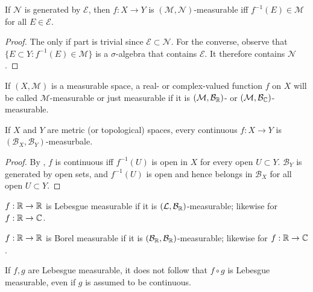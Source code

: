 \begin{proposition}
    If $\mathcal{N}$ is generated by $\mathcal{E}$, then $f: X \to Y$ is $(\mathcal{M}, \mathcal{N})$-measurable iff $f^{-1}(E) \in \mathcal{M}$ for all $E \in \mathcal{E}$. 
\end{proposition}

\begin{proof}
    The only if part is trivial since $\mathcal{E} \subset \mathcal{N}$.
    For the converse, observe that $\{ E \subset Y: f^{-1}(E) \in \mathcal{M} \}$ is a $\sigma$-algebra that contains $\mathcal{E}$.
    It therefore contains $\mathcal{N}$.
\end{proof}

\begin{definition}
    If $(X, \mathcal{M})$ is a measurable space, a real- or complex-valued function $f$ on $X$ will be called $\mathcal{M}$-measurable or just measurable if it is $(\mathcal{M}, \mathcal{B}_{\mathbb{R}})$- or $(\mathcal{M}, \mathcal{B}_{\mathbb{C}})$-measurable.
\end{definition}

\begin{corollary}
    If $X$ and $Y$ are metric (or topological) spaces, every continuous $f:X \to Y$ is $(\mathcal{B}_{X}, \mathcal{B}_{Y})$-measurbale.
\end{corollary}

\begin{proof}
    By , $f$ is continuous iff $f^{-1}(U)$ is open in $X$ for every open $U \subset Y$.
    $\mathcal{B}_{Y}$ is generated by open sets, and $f^{-1}(U)$ is open and hence belongs in $\mathcal{B}_{X}$ for all open $U \subset Y$.
\end{proof}

\begin{definition}
    $f: \mathbb{R} \to \mathbb{R}$ is Lebesgue measurable if it is $(\mathcal{L}, \mathcal{B}_{\mathbb{R}})$-measurable; likewise for $f:\mathbb{R} \to \mathbb{C}$.
\end{definition}

\begin{definition}
    $f: \mathbb{R} \to \mathbb{R}$ is Borel measurable if it is $(\mathcal{B}_{\mathbb{R}}, \mathcal{B}_{\mathbb{R}})$-measurable; likewise for $f:\mathbb{R} \to \mathbb{C}$.
\end{definition}

\begin{remark}
    If $f, g$ are Lebesgue measurable, it does not follow that $f \circ g$ is Lebesgue measurable, even if $g$ is assumed to be continuous.
\end{remark}

